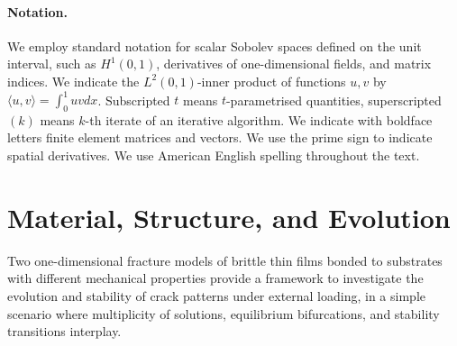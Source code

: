 \documentclass[10pt]{article}
\begin{document}
\paragraph{Notation.} We employ standard notation for scalar Sobolev spaces defined on the unit interval, such as $H^1(0, 1)$, derivatives of one-dimensional fields, and matrix indices. We indicate the $L^2(0, 1)$-inner product of functions $u, v$ by $\langle u, v\rangle=\int_0^1 uv dx$. Subscripted $t$ means $t$-parametrised quantities, superscripted $(k)$ means $k$-th iterate of an iterative algorithm.
We indicate with boldface letters finite element matrices and vectors.
We use the prime sign to indicate spatial derivatives.
%
%
We use American English spelling throughout the text.
%
%
\section{Material, Structure, and Evolution}
\label{sec:rigid}
Two one-dimensional fracture models of brittle thin films bonded to substrates with different mechanical properties provide a framework to investigate the evolution and stability of crack patterns under external loading, in a  simple scenario where multiplicity of solutions, equilibrium bifurcations, and stability transitions interplay.
\end{document}
